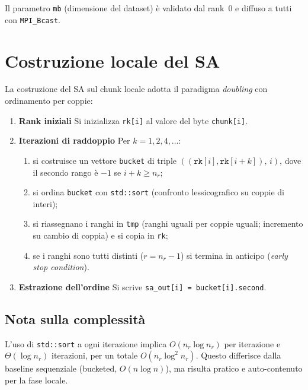 		Il parametro \texttt{mb} (dimensione del dataset) è validato dal rank~0 e diffuso a tutti con \texttt{MPI\_Bcast}.
	
	\section{Costruzione locale del SA}
		La costruzione del SA sul chunk locale adotta il paradigma \emph{doubling} con ordinamento per coppie:
		\begin{enumerate}
			\item \textbf{Rank iniziali} Si inizializza \texttt{rk[i]} al valore del byte \texttt{chunk[i]}.
			\item \textbf{Iterazioni di raddoppio} Per $k=1,2,4,\dots$:
			\begin{enumerate}
				\item si costruisce un vettore \texttt{bucket} di triple \(((\texttt{rk}[i], \texttt{rk}[i+k]),\, i)\), dove il secondo rango è $-1$ se $i+k \ge n_r$;
				\item si ordina \texttt{bucket} con \texttt{std::sort} (confronto lessicografico su coppie di interi);
				\item si riassegnano i ranghi in \texttt{tmp} (ranghi uguali per coppie uguali; incremento su cambio di coppia) e si copia in \texttt{rk};
				\item se i ranghi sono tutti distinti ($r = n_r-1$) si termina in anticipo (\textit{early stop condition}).
			\end{enumerate}
			\item \textbf{Estrazione dell'ordine} Si scrive \texttt{sa\_out[i] = bucket[i].second}.
		\end{enumerate}
		
		\subsection*{Nota sulla complessità}
			L'uso di \texttt{std::sort} a ogni iterazione implica $O(n_r \log n_r)$ per iterazione e $\Theta(\log n_r)$ iterazioni, per un totale $O(n_r \log^2 n_r)$.
			Questo differisce dalla baseline sequenziale (bucketed, $O(n \log n)$), ma risulta pratico e auto-contenuto per la fase locale.
	

